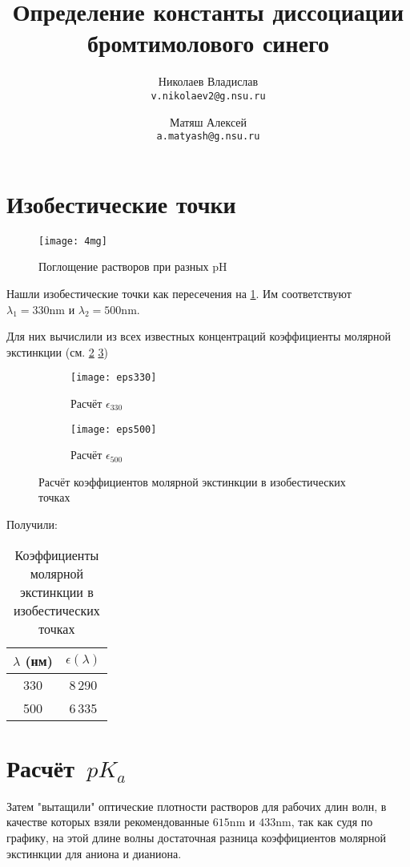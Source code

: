 \documentclass{article}
\author{Николаев Владислав\\
	\texttt{v.nikolaev2@g.nsu.ru} \and
	Матяш Алексей\\
	\texttt{a.matyash@g.nsu.ru}}
\title{Определение константы диссоциации бромтимолового синего}
\begin{document}
	\maketitle
	\section{Изобестические точки}
	\begin{figure}[h]
		\centering
		\texttt{[image: 4mg]}
		\caption{Поглощение растворов при разных pH}
		\label{fig:isobest}
	\end{figure}
	Нашли изобестические точки как пересечения на \ref{fig:isobest}. Им соответствуют $\lambda_1=330\unit{\nano\meter}$ и $\lambda_2=500\unit{\nano\meter}$.
	
	Для них вычислили из всех известных концентраций коэффициенты молярной экстинкции (см. \ref{fig:eps330} \ref{fig:eps500})
	
	\begin{figure}[htbp]
		\centering
		\begin{subfigure}{0.49\textwidth}
			\centering
			\texttt{[image: eps330]} 
			\caption{Расчёт $\epsilon_{330}$}
			\label{fig:eps330}
		\end{subfigure}
		\hfill
		\begin{subfigure}{0.49\textwidth}
			\centering
			\texttt{[image: eps500]}  %
			\caption{Расчёт $\epsilon_{500}$}
			\label{fig:eps500}
		\end{subfigure}
		\caption{Расчёт коэффициентов молярной экстинкции в изобестических точках}
		\label{fig:linearisobest}
	\end{figure}
	
	Получили:
	\begin{table}[htbp]
		\centering
		\caption{Коэффициенты молярной экстинкции в изобестических точках}  %
		\begin{tabular}{cc}  %
			\toprule
			\textbf{$\lambda$ (нм)} & \textbf{$\epsilon(\lambda)$} \\  %
			\midrule
			330 & 8\,290 \\  %
			500 & 6\,335 \\  %
			\bottomrule
		\end{tabular}
	\end{table}
	
	\section{Расчёт $\,pK_a$}
	Затем "вытащили" оптические плотности растворов для рабочих длин волн, в качестве которых  взяли рекомендованные $615\unit{\nano\meter}$ и $\unit{433\nano\meter}$, так как судя по графику, на этой длине волны достаточная разница коэффициентов молярной экстинкции для аниона и дианиона.
	
\end{document}
